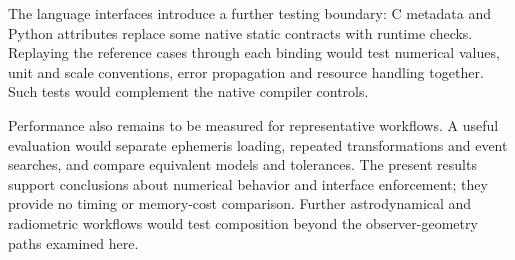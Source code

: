 The language interfaces introduce a further testing boundary: C metadata and Python attributes
replace some native static contracts with runtime checks. Replaying the reference cases through
each binding would test numerical values, unit and scale conventions, error propagation and
resource handling together. Such tests would complement the native compiler controls.

Performance also remains to be measured for representative workflows. A useful evaluation would
separate ephemeris loading, repeated transformations and event searches, and compare equivalent
models and tolerances. The present results support conclusions about numerical behavior and
interface enforcement; they provide no timing or memory-cost comparison. Further astrodynamical and
radiometric workflows would test composition beyond the observer-geometry paths examined here.
